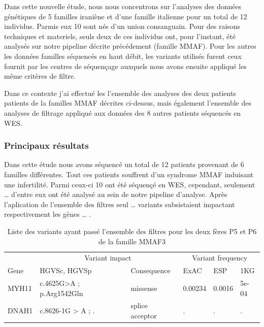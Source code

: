 \documentclass[12pt,twoside]{reedthesis}
\theoremstyle{definition}
\theoremstyle{definition}
\theoremstyle{remark}
\begin{document}
  Dans cette nouvelle étude, nous nous concentrons sur l'analyses des
  données génétiques de 5 familles iraniène et d'une famille italienne
  pour un total de 12 individus. Parmis eux 10 sont nés d'un union
  consanguain. Pour des raisons techniques et materiels, seuls deux de ces
  individus ont, pour l'instant, été analysés sur notre pipeline décrite
  précédement (famille MMAF). Pour les autres les données familles
  séquencés en haut débit, les variants utilisés furent ceux fournit par
  les centres de séquençage auxquels nous avons ensuite appliqué les même
  critères de filtre.
  
  Dans ce contexte j'ai effectué les l'ensemble des analyses des deux
  patients patients de la familles MMAF décrites ci-dessus, mais également
  l'ensemble des analyses de filtrage appliqué aux données des 8 autres
  patients séquencés en WES.
  
  \newpage
  
  
  
  \newpage
  
  \subsubsection{Principaux résultats}\label{principaux-resultats-2}
  
  Dans cette étude nous avons séquencé un total de 12 patients provenant
  de 6 familles différentes. Tout ces patients souffrent d'un syndrome
  MMAF induisant une infertilité. Parmi ceux-ci 10 ont été séquençé en
  WES, cependant, seulement \ldots{} d'entre eux ont été analysé au sein
  de notre pipeline d'analyse. Après l'aplication de l'ensemble des
  filtres seul \ldots{} variants subsistaient impactant respectivement les
  gènes \ldots{} .
  
  \begin{longtable}[t]{llllll}
  \caption{\label{tab:tabrecapmmaf}Liste des variants ayant passé l'ensemble des filtres pour les deux fères P5 et P6 de la famille MMAF3}\\
  \toprule
  \multicolumn{1}{c}{ } & \multicolumn{2}{c}{Variant impact} & \multicolumn{3}{c}{Variant frequency} \\
  \cmidrule(l{2pt}r{2pt}){2-3} \cmidrule(l{2pt}r{2pt}){4-6}
  Gene & HGVSc, HGVSp & Consequence & ExAC & ESP & 1KG\\
  \midrule
  MYH11 & c.4625G>A ; p.Arg1542Gln & missense & 0.00234 & 0.0016 & 5e-04\\
  DNAH1 & c.8626-1G > A ; . & splice acceptor & . & . & .\\
  \bottomrule
  \end{longtable}
  
\end{document}
